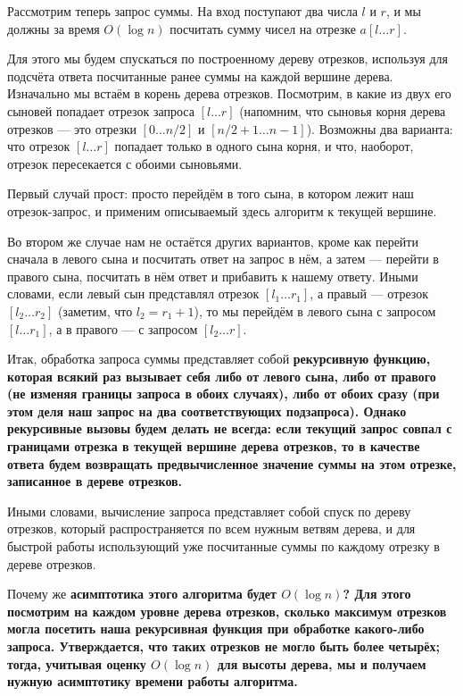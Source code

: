 Рассмотрим теперь запрос суммы. На вход поступают два числа $l$ и $r$, и мы должны за время $O (\log n)$ посчитать сумму чисел на отрезке $a[l \ldots r]$.

Для этого мы будем спускаться по построенному дереву отрезков, используя для подсчёта ответа посчитанные ранее суммы на каждой вершине дерева. Изначально мы встаём в корень дерева отрезков. Посмотрим, в какие из двух его сыновей попадает отрезок запроса $[l \ldots r]$ (напомним, что сыновья корня дерева отрезков --- это отрезки $[0 \ldots n/2]$ и $[n/2+1 \ldots n-1]$). Возможны два варианта: что отрезок $[l \ldots r]$ попадает только в одного сына корня, и что, наоборот, отрезок пересекается с обоими сыновьями.

Первый случай прост: просто перейдём в того сына, в котором лежит наш отрезок-запрос, и применим описываемый здесь алгоритм к текущей вершине.

Во втором же случае нам не остаётся других вариантов, кроме как перейти сначала в левого сына и посчитать ответ на запрос в нём, а затем --- перейти в правого сына, посчитать в нём ответ и прибавить к нашему ответу. Иными словами, если левый сын представлял отрезок $[l_1 \ldots r_1]$, а правый --- отрезок $[l_2 \ldots r_2]$ (заметим, что $l_2 = r_1 + 1$), то мы перейдём в левого сына с запросом $[l \ldots r_1]$, а в правого --- с запросом $[l_2 \ldots r]$.

Итак, обработка запроса суммы представляет собой \bf{рекурсивную функцию}, которая всякий раз вызывает себя либо от левого сына, либо от правого (не изменяя границы запроса в обоих случаях), либо от обоих сразу (при этом деля наш запрос на два соответствующих подзапроса). Однако рекурсивные вызовы будем делать не всегда: если текущий запрос совпал с границами отрезка в текущей вершине дерева отрезков, то в качестве ответа будем возвращать предвычисленное значение суммы на этом отрезке, записанное в дереве отрезков.

Иными словами, вычисление запроса представляет собой спуск по дереву отрезков, который распространяется по всем нужным ветвям дерева, и для быстрой работы использующий уже посчитанные суммы по каждому отрезку в дереве отрезков.

Почему же \bf{асимптотика} этого алгоритма будет $O (\log n)$? Для этого посмотрим на каждом уровне дерева отрезков, сколько максимум отрезков могла посетить наша рекурсивная функция при обработке какого-либо запроса. Утверждается, что таких отрезков не могло быть более четырёх; тогда, учитывая оценку $O (\log n)$ для высоты дерева, мы и получаем нужную асимптотику времени работы алгоритма.

